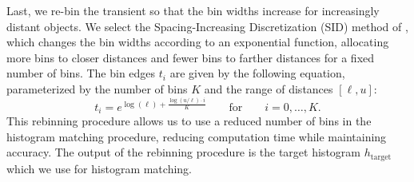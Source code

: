 \vspace{0.8em}
Last, we re-bin the transient so that the bin widths increase for increasingly
distant objects. We select the Spacing-Increasing Discretization
(SID) method of \cite{Fu2018}, which changes the bin widths according to an  
exponential function, allocating more bins to closer distances and fewer
bins to farther distances for a fixed number of bins. The bin edges $t_i$ are
given by the following equation,
parameterized by the number of bins $K$ and the range of distances $[\ell, u]$: 
%
\begin{equation}
  t_i = e^{\log(\ell) + \frac{\log(u/\ell) \cdot i}{K}}  \qquad\text{for}\qquad i = 0,\ldots, K.
  \label{eq:sid_bin_edges}
\end{equation}
%
This rebinning procedure allows us to use a reduced number of bins in the histogram
matching procedure, reducing computation time while maintaining accuracy.
 The output of the rebinning procedure is the
target histogram $h_\text{target}$ which we use for histogram matching. 



